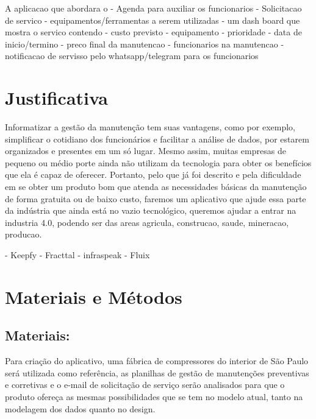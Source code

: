 \documentclass[%
  a4paper,%
  12pt,%
  english,%
  brazilian,%
]{article}
\begin{document}
A aplicacao que abordara o 
- Agenda para auxiliar os funcionarios
- Solicitacao de servico
- equipamentos/ferramentas a serem utilizadas
- um dash board que mostra o servico contendo
    - custo previsto
    - equipamento
    - prioridade 
    - data de inicio/termino
    - preco final da manutencao
    - funcionarios na manutencao
- notificacao de servisso pelo whatsapp/telegram para os funcionarios

\section{Justificativa}%
Informatizar a gestão da manutenção tem suas vantagens, como por exemplo, simplificar o cotidiano dos funcionários e facilitar a análise de dados, por estarem organizados e presentes em um só lugar. Mesmo assim, muitas empresas de pequeno ou médio porte ainda não utilizam da tecnologia para obter os benefícios que ela é capaz de oferecer. Portanto, pelo que já foi descrito e pela dificuldade em se obter um produto bom que atenda as necessidades básicas da manutenção de forma gratuita ou de baixo custo, faremos um aplicativo que ajude essa parte da indústria que ainda está no vazio tecnológico, queremos ajudar a entrar na industria 4.0, podendo ser das areas agricula, construcao, saude, mineracao, producao.

- Keepfy
- Fracttal
- infraspeak
- Fluix


\section{Materiais e Métodos}%



\subsection{Materiais:}%
Para criação do aplicativo, uma fábrica de compressores do interior de São Paulo será utilizada como referência, as planilhas de gestão de manutenções preventivas e corretivas e o e-mail de solicitação de serviço serão analisados para que o produto ofereça as mesmas possibilidades que se tem no modelo atual, tanto na modelagem dos dados quanto no design.
\end{document}
